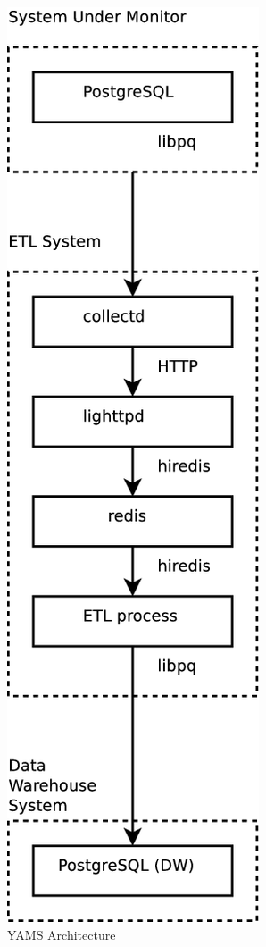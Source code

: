 \documentclass[twocolumn,letterpaper]{article}
\begin{document}
\begin{figure}[ht]
  \begin{center}
  \includegraphics[scale=0.35]{a}
  \end{center}
  \caption{YAMS Architecture}
  \label{architecture}
\end{figure}
\end{document}
